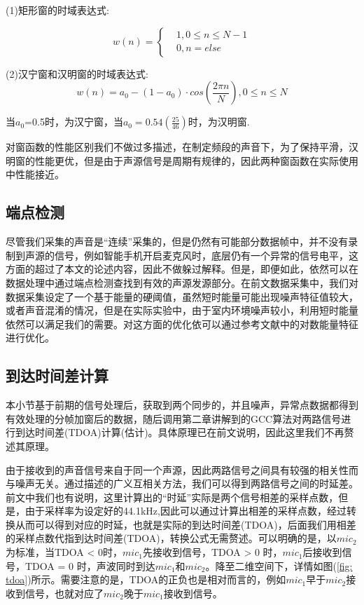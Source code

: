 \documentclass[winfonts,oneside]{njuthesis}
\begin{document}
			(1)矩形窗的时域表达式:
			
			\begin{equation}
				w(n)=\left\{
				\begin{aligned}
					&1, 0\leq n \leq N - 1\\
					&0, n = else
				\end{aligned}
				\right.
			\end{equation}
			
			
			(2)汉宁窗和汉明窗的时域表达式:
			\begin{equation}
				w(n)=a_0-(1-a_0)\cdot cos(\frac{2\pi n}{N}), 0 \leq n \leq N
			\end{equation}
			
			当$a_0$=0.5时，为汉宁窗，当$a_0=0.54(\frac{25}{46})$时，为汉明窗.
			
			对窗函数的性能区别我们不做过多描述，在制定频段的声音下，为了保持平滑，汉明窗的性能更优，但是由于声源信号是周期有规律的，因此两种窗函数在实际使用中性能接近。
			
			
		\subsection{端点检测}
		
			尽管我们采集的声音是“连续”采集的，但是仍然有可能部分数据帧中，并不没有录制到声源的信号，例如智能手机开启麦克风时，底层仍有一个异常的信号电平，这方面的超过了本文的论述内容，因此不做躲过解释。但是，即便如此，依然可以在数据处理中通过端点检测查找到有效的声源发源部分。在前文数据采集中，我们对数据采集设定了一个基于能量的硬阈值，虽然短时能量可能出现噪声特征值较大，或者声音混淆的情况，但是在实际实验中，由于室内环境噪声较小，利用短时能量依然可以满足我们的需要。对这方面的优化依可以通过参考文献\cite{Endpoint_detection}中的对数能量特征进行优化。
		
		\subsection{到达时间差计算}
			
			本小节基于前期的信号处理后，获取到两个同步的，并且噪声，异常点数据都得到有效处理的分帧加窗后的数据，随后调用第二章讲解到的GCC算法对两路信号进行到达时间差(TDOA)计算(估计)。具体原理已在前文说明，因此这里我们不再赘述其原理。
			
			由于接收到的声音信号来自于同一个声源，因此两路信号之间具有较强的相关性而与噪声无关。通过描述的广义互相关方法，我们可以得到两路信号之间的时延差。前文中我们也有说明，这里计算出的“时延”实际是两个信号相差的采样点数，但是，由于采样率为设定好的44.1kHz,因此可以通过计算出相差的采样点数，经过转换从而可以得到对应的时延，也就是实际的到达时间差(TDOA)，后面我们用相差的采样点数代指到达时间差(TDOA)，转换公式无需赘述。可以明确的是，以$mic_2$为标准，当TDOA < 0时，$mic_1$先接收到信号，TDOA > 0 时，$mic_1$后接收到信号，TDOA = 0 时，声波同时到达$mic_1$和$mic_2$。降至二维空间下，详情如图(\ref{fig: tdoa})所示。需要注意的是，TDOA的正负也是相对而言的，例如$mic_1$早于$mic_2$接收到信号，也就对应了$mic_2$晚于$mic_1$接收到信号。
			
\end{document}
